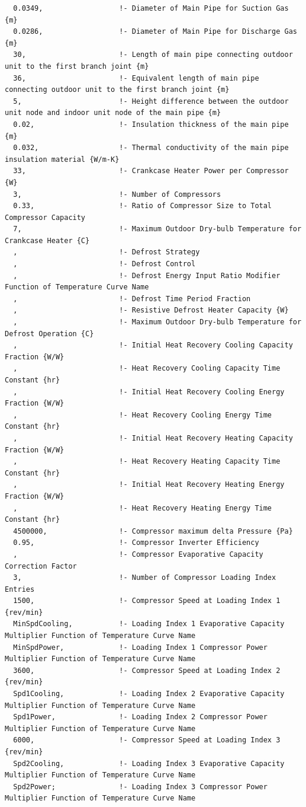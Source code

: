 \begin{lstlisting}
  0.0349,                  !- Diameter of Main Pipe for Suction Gas {m}
  0.0286,                  !- Diameter of Main Pipe for Discharge Gas {m}
  30,                      !- Length of main pipe connecting outdoor unit to the first branch joint {m}
  36,                      !- Equivalent length of main pipe connecting outdoor unit to the first branch joint {m}
  5,                       !- Height difference between the outdoor unit node and indoor unit node of the main pipe {m}
  0.02,                    !- Insulation thickness of the main pipe {m}
  0.032,                   !- Thermal conductivity of the main pipe insulation material {W/m-K}
  33,                      !- Crankcase Heater Power per Compressor {W}
  3,                       !- Number of Compressors
  0.33,                    !- Ratio of Compressor Size to Total Compressor Capacity
  7,                       !- Maximum Outdoor Dry-bulb Temperature for Crankcase Heater {C}
  ,                        !- Defrost Strategy
  ,                        !- Defrost Control
  ,                        !- Defrost Energy Input Ratio Modifier Function of Temperature Curve Name
  ,                        !- Defrost Time Period Fraction
  ,                        !- Resistive Defrost Heater Capacity {W}
  ,                        !- Maximum Outdoor Dry-bulb Temperature for Defrost Operation {C}
  ,                        !- Initial Heat Recovery Cooling Capacity Fraction {W/W}
  ,                        !- Heat Recovery Cooling Capacity Time Constant {hr}
  ,                        !- Initial Heat Recovery Cooling Energy Fraction {W/W}
  ,                        !- Heat Recovery Cooling Energy Time Constant {hr}
  ,                        !- Initial Heat Recovery Heating Capacity Fraction {W/W}
  ,                        !- Heat Recovery Heating Capacity Time Constant {hr}
  ,                        !- Initial Heat Recovery Heating Energy Fraction {W/W}
  ,                        !- Heat Recovery Heating Energy Time Constant {hr}
  4500000,                 !- Compressor maximum delta Pressure {Pa}
  0.95,                    !- Compressor Inverter Efficiency
  ,                        !- Compressor Evaporative Capacity Correction Factor
  3,                       !- Number of Compressor Loading Index Entries
  1500,                    !- Compressor Speed at Loading Index 1 {rev/min}
  MinSpdCooling,           !- Loading Index 1 Evaporative Capacity Multiplier Function of Temperature Curve Name
  MinSpdPower,             !- Loading Index 1 Compressor Power Multiplier Function of Temperature Curve Name
  3600,                    !- Compressor Speed at Loading Index 2 {rev/min}
  Spd1Cooling,             !- Loading Index 2 Evaporative Capacity Multiplier Function of Temperature Curve Name
  Spd1Power,               !- Loading Index 2 Compressor Power Multiplier Function of Temperature Curve Name
  6000,                    !- Compressor Speed at Loading Index 3 {rev/min}
  Spd2Cooling,             !- Loading Index 3 Evaporative Capacity Multiplier Function of Temperature Curve Name
  Spd2Power;               !- Loading Index 3 Compressor Power Multiplier Function of Temperature Curve Name


\end{lstlisting}
